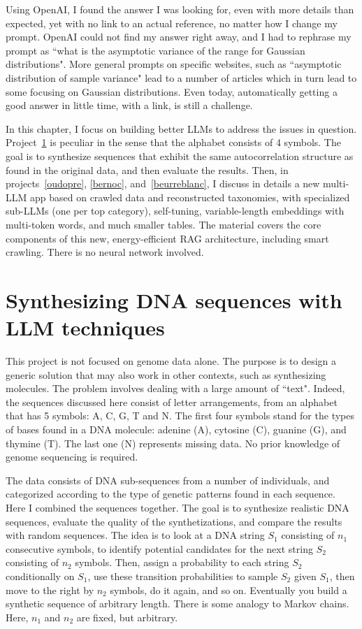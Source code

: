 \documentclass[oneside,10pt]{book}
\begin{document}
Using OpenAI, I found the answer I was looking for, even with more details than expected, yet with no link to an actual reference, no matter how I change my prompt. OpenAI could not find my answer right away, and I had to rephrase my prompt as 
``what is the asymptotic variance of the range for Gaussian distributions". More general prompts on specific websites, such as ``asymptotic distribution of sample variance" lead to a number of articles which in turn lead to some focusing on Gaussian distributions. Even today, 
 automatically getting a good answer in little time, with a link, is still a challenge.

In this chapter, I focus on building better \textcolor{index}{LLMs} to address the issues in question. Project~\ref{dnalove} is peculiar in the sense
 that the alphabet consists of 4 symbols. The goal is to synthesize sequences that exhibit the same autocorrelation structure as found in the original data, and then evaluate the results. Then, in projects~\ref{oudopre}, \ref{bernoc}, and~\ref{beurreblanc}, 
I discuss in details a new multi-LLM app based on crawled data and reconstructed taxonomies, with specialized sub-LLMs (one per top category), self-tuning,
 variable-length embeddings with multi-token words, and much smaller tables. The material covers the core components of this new, energy-efficient 
\textcolor{index}{RAG} architecture,
 including smart crawling. There is no neural network involved. 

\section{Synthesizing DNA sequences with LLM techniques}\label{dnalove}

This project is not focused on genome data alone. The purpose is to design a generic solution that may also work in other contexts, such as
 synthesizing molecules. The problem involves dealing with a large amount of ``text". Indeed, the sequences discussed here consist of 
 letter arrangements, from an alphabet that has 5 symbols:  A, C, G, T and N.  The first four symbols stand for the  types of bases found in a DNA molecule: adenine (A), cytosine (C), guanine (G), and thymine (T). The last one (N) represents missing data. No prior knowledge of
  genome sequencing is required.

The data consists of DNA sub-sequences from a number of individuals, and categorized according to the type of genetic patterns found in each
 sequence. Here I combined the sequences together. The goal is to synthesize realistic DNA sequences, evaluate the quality of the synthetizations, and
 compare the results with random sequences.  The idea is to look at a DNA string $S_1$ consisting of $n_1$ consecutive symbols, to identify
  potential candidates for the next string $S_2$ consisting of $n_2$ symbols. Then, assign a probability to each string $S_2$ conditionally
 on $S_1$, use these transition probabilities to sample $S_2$ given $S_1$, then move to the right by $n_2$ symbols, do it again, and so on. 
 Eventually you build a synthetic sequence of arbitrary length. There is some analogy to \textcolor{index}{Markov chains}. 
 Here, $n_1$ and $n_2$ are fixed, but arbitrary.
\end{document}
